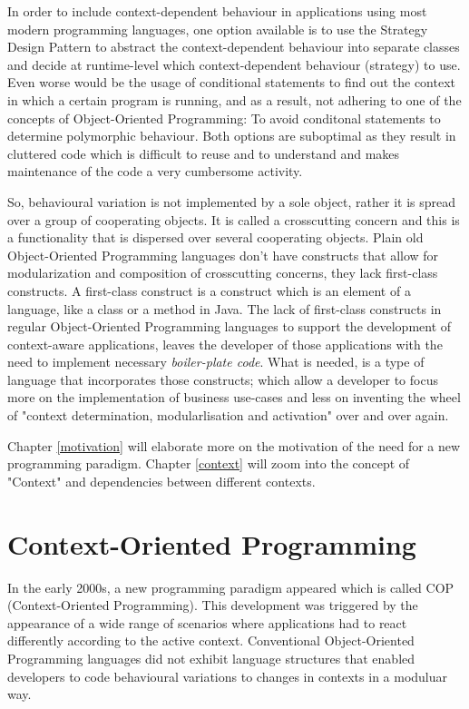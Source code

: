 \documentclass{acm_proc_article-sp}
\begin{document}
In order to include context-dependent behaviour in applications using most modern programming languages, one option available is to use the Strategy Design Pattern \cite{strategypattern} to abstract the context-dependent behaviour into separate classes and decide at runtime-level which context-dependent behaviour (strategy) to use. Even worse would be the usage of conditional statements to find out the context in which a certain program is running, and as a result, not adhering to one of the concepts of Object-Oriented Programming: To avoid conditonal statements to determine polymorphic behaviour. Both options are suboptimal as they result in cluttered code which is difficult to reuse and to understand and makes maintenance of the code a very cumbersome activity.

So, behavioural variation is not implemented by a sole object, rather it is spread over a group of cooperating objects. It is called a crosscutting concern \cite{kiczalesetallaop} and this is a functionality that is dispersed over several cooperating objects. Plain old Object-Oriented Programming languages don't have constructs that allow for modularization and composition of crosscutting concerns, they lack first-class constructs. A first-class construct \cite{Keays:2003:CP:940923.940926} is a construct which is an element of a language, like a class or a method in Java. The lack of first-class constructs in regular Object-Oriented Programming languages to support the development of context-aware applications, leaves the developer of those applications with the need to implement necessary \textit{boiler-plate code}. What is needed, is a type of language that incorporates those constructs; which allow a developer to focus more on the implementation of business use-cases and less on inventing the wheel of "context determination, modularlisation and activation" over and over again. 

Chapter \ref{motivation} will elaborate more on the motivation of the need for a new programming paradigm. Chapter \ref{context} will zoom into the concept of "Context" and dependencies between different contexts. 

\section{Context-Oriented Programming}\label{cop}
In the early 2000s, a new programming paradigm appeared which is called COP (Context-Oriented Programming). This development was triggered by the appearance of a wide range of scenarios where applications had to react differently according to the active context. Conventional Object-Oriented Programming languages did not exhibit language structures that enabled developers to code behavioural variations to changes in contexts in a moduluar way. 
\end{document}
